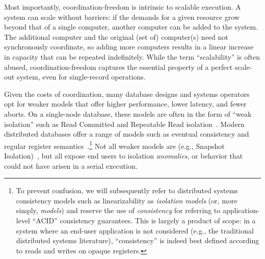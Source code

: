 

 Most importantly,
coordination-freedom is intrinsic to scalable execution. A \cfree
system can scale without barriers: if the demands for a given resource
grow beyond that of a single computer, another computer can be added
to the system. The additional computer and the original (set of)
computer(s) need not synchronously coordinate, so adding more
computers results in a linear increase in capacity that can be
repeated indefinitely. While the term ``scalability'' is often abused,
coordination-freedom captures the essential property of a perfect
scale-out system, even for single-record operations.


 Given the costs of coordination, many
database designs and systems operators opt for weaker models that
offer higher performance, lower latency, and fewer aborts. On a
single-node database, these models are often in the form of ``weak
isolation'' such as Read Committed and Repeatable Read
isolation~\cite{adya-isolation}. Modern distributed databases offer a
range of models such as eventual consistency and regular register
semantics~\cite{hat-vldb}.\footnote{To prevent confusion, we will
  subsequently refer to distributed systems consistency models such as
  linearizability as \textit{isolation models} (or, more simply,
  \textit{models}) and reserve the use of \textit{consistency} for
  referring to application-level ``ACID'' consistency guarantees. This
  is largely a product of scope: in a system where an end-user
  application is not considered (e.g., the traditional distributed
  systems literature), ``consistency'' is indeed best defined
  according to reads and writes on opaque registers.}  Not all weaker
models are \cfree (e.g., Snapshot Isolation)~\cite{hat-vldb}, but all
expose end users to isolation \textit{anomalies}, or behavior that
could not have arisen in a serial execution.

